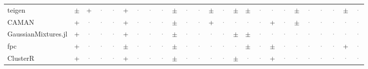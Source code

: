 \documentclass[10pt,a4paper]{article}
\begin{document}
\begin{landscape}
{\begin{longtable}{@{}l *{24}{c}@{}}
teigen & \cellcolor{part!45}$\pm$ & \cellcolor{yes!35}+ & \textcolor{gray}{·} & \textcolor{gray}{·} & \cellcolor{yes!35}+ & \textcolor{gray}{·} & \textcolor{gray}{·} & \textcolor{gray}{·} & \cellcolor{part!45}$\pm$ & \textcolor{gray}{·} & \textcolor{gray}{·} & \cellcolor{part!45}$\pm$ & \textcolor{gray}{·} & \cellcolor{part!45}$\pm$ & \cellcolor{part!45}$\pm$ & \textcolor{gray}{·} & \textcolor{gray}{·} & \textcolor{gray}{·} & \cellcolor{part!45}$\pm$ & \textcolor{gray}{·} & \textcolor{gray}{·} & \textcolor{gray}{·} & \cellcolor{part!45}$\pm$ & \textcolor{gray}{·} \\
CAMAN & \cellcolor{yes!35}+ & \textcolor{gray}{·} & \textcolor{gray}{·} & \textcolor{gray}{·} & \cellcolor{yes!35}+ & \textcolor{gray}{·} & \textcolor{gray}{·} & \textcolor{gray}{·} & \cellcolor{part!45}$\pm$ & \textcolor{gray}{·} & \textcolor{gray}{·} & \cellcolor{yes!35}+ & \textcolor{gray}{·} & \textcolor{gray}{·} & \textcolor{gray}{·} & \textcolor{gray}{·} & \cellcolor{yes!35}+ & \textcolor{gray}{·} & \cellcolor{part!45}$\pm$ & \textcolor{gray}{·} & \textcolor{gray}{·} & \textcolor{gray}{·} & \textcolor{gray}{·} & \textcolor{gray}{·} \\
GaussianMixtures.jl & \cellcolor{yes!35}+ & \textcolor{gray}{·} & \textcolor{gray}{·} & \textcolor{gray}{·} & \cellcolor{yes!35}+ & \textcolor{gray}{·} & \textcolor{gray}{·} & \textcolor{gray}{·} & \cellcolor{part!45}$\pm$ & \textcolor{gray}{·} & \textcolor{gray}{·} & \textcolor{gray}{·} & \textcolor{gray}{·} & \cellcolor{part!45}$\pm$ & \cellcolor{part!45}$\pm$ & \textcolor{gray}{·} & \textcolor{gray}{·} & \textcolor{gray}{·} & \textcolor{gray}{·} & \textcolor{gray}{·} & \textcolor{gray}{·} & \textcolor{gray}{·} & \textcolor{gray}{·} & \textcolor{gray}{·} \\
fpc & \cellcolor{yes!35}+ & \textcolor{gray}{·} & \textcolor{gray}{·} & \textcolor{gray}{·} & \cellcolor{part!45}$\pm$ & \textcolor{gray}{·} & \textcolor{gray}{·} & \textcolor{gray}{·} & \cellcolor{part!45}$\pm$ & \textcolor{gray}{·} & \textcolor{gray}{·} & \textcolor{gray}{·} & \textcolor{gray}{·} & \textcolor{gray}{·} & \cellcolor{part!45}$\pm$ & \textcolor{gray}{·} & \cellcolor{part!45}$\pm$ & \textcolor{gray}{·} & \textcolor{gray}{·} & \textcolor{gray}{·} & \textcolor{gray}{·} & \textcolor{gray}{·} & \cellcolor{yes!35}+ & \textcolor{gray}{·} \\
ClusterR & \cellcolor{yes!35}+ & \textcolor{gray}{·} & \textcolor{gray}{·} & \textcolor{gray}{·} & \cellcolor{yes!35}+ & \textcolor{gray}{·} & \textcolor{gray}{·} & \textcolor{gray}{·} & \cellcolor{part!45}$\pm$ & \textcolor{gray}{·} & \textcolor{gray}{·} & \textcolor{gray}{·} & \textcolor{gray}{·} & \cellcolor{part!45}$\pm$ & \textcolor{gray}{·} & \textcolor{gray}{·} & \cellcolor{yes!35}+ & \textcolor{gray}{·} & \textcolor{gray}{·} & \textcolor{gray}{·} & \textcolor{gray}{·} & \textcolor{gray}{·} & \textcolor{gray}{·} & \textcolor{gray}{·} \\

\end{longtable}}
\end{landscape}
\end{document}
